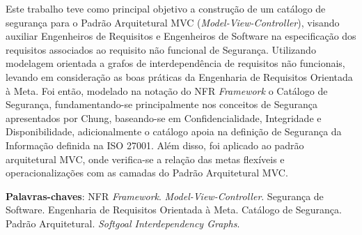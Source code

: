 \begin{resumo}
 Este trabalho teve como principal objetivo a construção de um catálogo de segurança para o Padrão Arquitetural MVC (\textit{Model-View-Controller}), visando auxiliar Engenheiros de Requisitos e Engenheiros de Software na especificação dos requisitos associados ao requisito não funcional de Segurança. Utilizando modelagem orientada a grafos de interdependência de requisitos não funcionais, levando em consideração as boas práticas da Engenharia de Requisitos Orientada à Meta. Foi então, modelado na notação do NFR \textit{Framework} o Catálogo de Segurança, fundamentando-se principalmente nos conceitos de Segurança apresentados por Chung, baseando-se em Confidencialidade, Integridade e Disponibilidade, adicionalmente o catálogo apoia na definição de Segurança da Informação definida na ISO 27001. Além disso, foi aplicado ao padrão arquitetural MVC, onde verifica-se a relação das metas flexíveis e operacionalizações com as camadas do Padrão Arquitetural MVC.

 \vspace{\onelineskip}
    
 \noindent
 \textbf{Palavras-chaves}: NFR \textit{Framework}. \textit{Model-View-Controller}. Segurança de Software. Engenharia de Requisitos Orientada à Meta. Catálogo de Segurança. Padrão Arquitetural. \textit{Softgoal Interdependency Graphs}.
\end{resumo}
